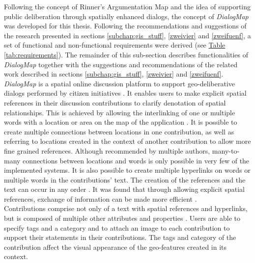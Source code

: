 Following the concept of Rinner's Argumentation Map \cite{Rinner_ArgumentationMaps} and the idea of supporting public deliberation through spatially enhanced dialogs, the concept of \textit{DialogMap} was developed for this thesis. Following the recommendations and suggestions of the research presented in sections \ref{subchap:gis_stuff}, \ref{zweivier} and \ref{zweifuenf}, a set of functional and non-functional requirements were derived (see \hyperref[tab:requirements]{Table \ref{tab:requirements}}). The remainder of this sub-section describes functionalities of \textit{DialogMap} together with the suggestions and recommendations of the related work described in sections \ref{subchap:gis_stuff}, \ref{zweivier} and \ref{zweifuenf}.\\
\textit{DialogMap} is a spatial online discussion platform to support geo-deliberative dialogs \cite{Cai2009_spatial_annotation_deliberation} performed by citizen initiatives   . It enables users to make explicit spatial references in their discussion contributions to clarify denotation of spatial relationships. This is achieved by allowing the interlinking of one or multiple words with a location or area on the map of the application \cite{Rinner_ArgumentationMaps}. It is possible to create multiple connections between locations in one contribution, as well as referring to locations created in the context of another contribution to allow more fine grained references. Although recommended by multiple authors, many-to-many connections between locations and words is only possible in very few \cite{Kessler2005_ArgumentationMapPrototype,Voss2004_Evolution_PGIS,you2009_participatory_map_based,Cai2009_spatial_annotation_deliberation} of the implemented systems. It is also possible to create multiple hyperlinks on words or multiple words in the contributions' text. The creation of the references and the text can occur in any order \cite{Voss2004_Evolution_PGIS}. It was found that through allowing explicit spatial references, exchange of information can be made more efficient \cite{Cherubini2007_shared_maps}.\\
Contributions comprise not only of a text with spatial references and hyperlinks, but is composed of multiple other attributes and properties \cite{Longueville2010_community_based_geoportals_web20,Kessler2005_ArgumentationMapPrototype,Kessler2005_Conflict_Resolution}. Users are able to specify tags and a category and to attach an image to each contribution \cite{Tang2005_PPGIS_discussion_forum,zhao2006geodf,you2009_participatory_map_based,Cai2009_spatial_annotation_deliberation} to support their statements in their contributions. The tags and category of the contribution affect the visual appearance of the geo-features created in its context.\\
